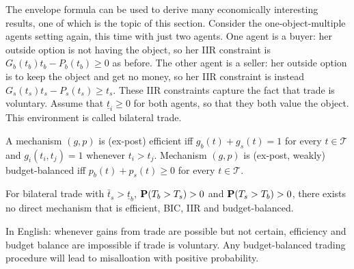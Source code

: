 \documentclass[11pt,letterpaper,reqno,oneside]{article}
\begin{document}
The envelope formula can be used to derive many economically interesting results, one of which is the topic of this section. Consider the one-object-multiple agents setting again, this time with just two agents. One agent is a buyer: her outside option is not having the object, so her IIR constraint is $G_b(t_b) t_b - P_b(t_b) \geq 0$ as before. The other agent is a seller: her outside option is to keep the object and get no money, so her IIR constraint is instead $G_s(t_s) t_s - P_s(t_s) \geq t_s$. These IIR constraints capture the fact that trade is voluntary. Assume that $\underline{t}_i \geq 0$ for both agents, so that they both value the object. This environment is called bilateral trade.

A mechanism $(g,p)$ is (ex-post) efficient iff $g_b(t)+g_s(t)=1$ for every $t \in \mathcal{T}$ and $g_i(t_i,t_j)=1$ whenever $t_i>t_j$. Mechanism $(g,p)$ is (ex-post, weakly) budget-balanced iff $p_b(t)+p_s(t) \geq 0$ for every $t \in \mathcal{T}$.
%
\begin{theorem}
	For bilateral trade with $\bar{t}_s > \underline{t}_b$, $\mathbf{P}( T_b > T_s ) > 0$ and $\mathbf{P}( T_s > T_b ) > 0$, there exists no direct mechanism that is efficient, BIC, IIR and budget-balanced.
\end{theorem}

\noindent In English: whenever gains from trade are possible but not certain, efficiency and budget balance are impossible if trade is voluntary. Any budget-balanced trading procedure will lead to misalloation with positive probability.
\end{document}
